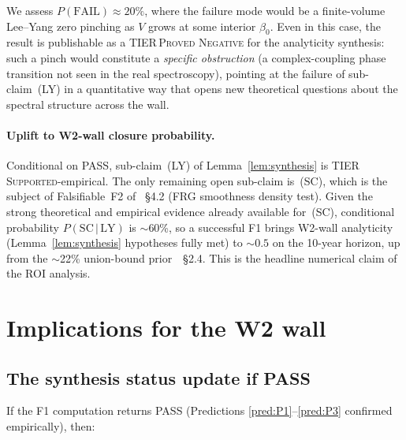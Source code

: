 \documentclass[11pt,a4paper]{article}
\theoremstyle{definition}
\theoremstyle{remark}
\begin{document}
We assess $P(\text{FAIL}) \approx 20\%$, where the failure mode
would be a finite-volume Lee--Yang zero pinching as $V$ grows at
some interior $\beta_0$. Even in this case, the result is
publishable as a TIER\,\textsc{Proved Negative} for the
analyticity synthesis: such a pinch would constitute a
\emph{specific obstruction} (a complex-coupling phase transition
not seen in the real spectroscopy), pointing at the failure of
sub-claim~(LY) in a quantitative way that opens new theoretical
questions about the spectral structure across the wall.

\paragraph{Uplift to W2-wall closure probability.} Conditional on
PASS, sub-claim~(LY) of Lemma~\ref{lem:synthesis} is
TIER\,\textsc{Supported}-empirical. The only remaining open
sub-claim is~(SC), which is the subject of Falsifiable~F2 of
\cite{W2analyticite2026}~\S4.2 (FRG smoothness density test).
Given the strong theoretical and empirical evidence already
available for~(SC), conditional probability
$P(\text{SC}\,|\,\text{LY})$ is $\sim$60\%, so a successful F1
brings W2-wall analyticity (Lemma~\ref{lem:synthesis} hypotheses
fully met) to $\sim 0.5$ on the 10-year horizon, up from the
$\sim$22\% union-bound prior~\cite{W2analyticite2026}~\S2.4. This
is the headline numerical claim of the ROI analysis.

\medskip

\section{Implications for the W2 wall}\label{sec:implications}

\subsection{The synthesis status update if PASS}

If the F1 computation returns PASS (Predictions
\ref{pred:P1}--\ref{pred:P3} confirmed empirically), then:
\end{document}
